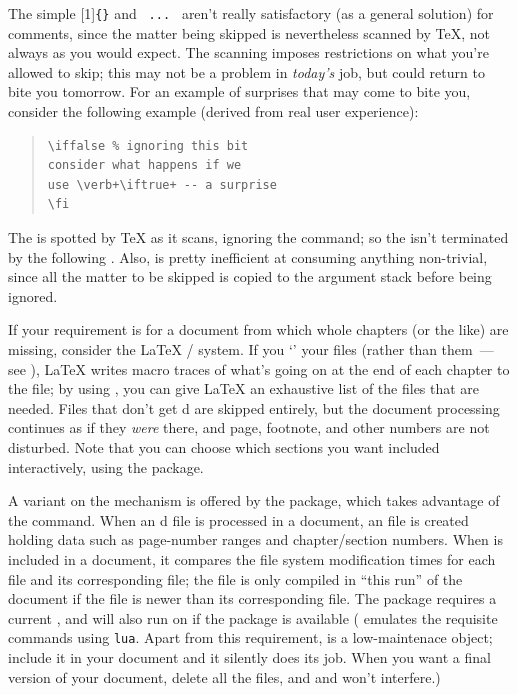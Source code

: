 The simple [1]\texttt{\{\}} 
and \texttt{ ... } aren't really satisfactory (as
a general solution) for comments, since the matter being skipped is
nevertheless scanned by \TeX{}, not always as you would expect.  The
scanning imposes restrictions on what you're allowed to skip; this may
not be a problem in \emph{today's} job, but could return to bite you
tomorrow.  For an example of surprises that may come to bite you,
consider the following example (derived from real user experience):
\begin{quote}
\begin{verbatim}
\iffalse % ignoring this bit
consider what happens if we
use \verb+\iftrue+ -- a surprise
\fi
\end{verbatim}
\end{quote}
The  is spotted by \TeX{} as it scans, ignoring the
 command; so the  isn't terminated by the
following .  Also,  is pretty inefficient at
consuming anything non-trivial, since all the matter to be skipped is
copied to the argument stack before being ignored.

If your requirement is for a document from which whole chapters (or
the like) are missing, consider the \LaTeX{}
/ system.  If you `' your
files (rather than  them~--- see %
),
\LaTeX{} writes macro traces of what's going on at the end of each
chapter to the  file; by using , you can give
\LaTeX{} an exhaustive list of the files that are needed.  Files that
don't get d are skipped entirely, but the document
processing continues as if they \emph{were} there, and page, footnote,
and other numbers are not disturbed.  Note that you can choose which
sections you want included interactively, using the
 package.

A variant on the  mechanism is offered by the
 package, which takes advantage of the \pdftex{}
 command.  When an d file is
processed in a \latex{} document, an  file is created
holding data such as page-number ranges and chapter/section numbers.
When  is included in a document, it compares the
file system modification times for each file and its corresponding
 file; the file is only compiled in ``this run'' of the
document if the file is newer than its corresponding 
file.  The package requires a current \pdftex{}, and will also run on
\luatex{} if the  package is available
( emulates the requisite \pdftex{} commands using
\texttt{lua}.  Apart from this requirement,  is
a low-maintenace object; include it in your document and it silently
does its job.  When you want a final version of your document, delete
all the  files, and and  won't
interfere.)

